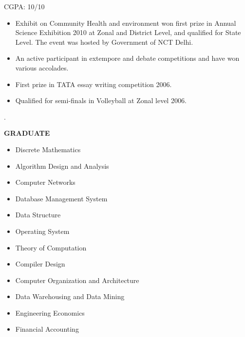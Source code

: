 \vspace{-1em}

CGPA: 10/10


\begin{itemize}
    \item Exhibit on Community Health and environment won first prize in Annual Science Exhibition 2010 at Zonal and District Level, and qualified for State Level. The event was hosted by Government of NCT Delhi.
    \item An active participant in extempore and debate competitions and have won various accolades.
    \item First prize in TATA essay writing competition 2006.
    \item Qualified for semi-finals in Volleyball at Zonal level 2006. 
\end{itemize}.

\vspace{-1.3em}


\textbf{GRADUATE}

\begin{itemize}
\item Discrete Mathematics
\item Algorithm Design and Analysis
\item Computer Networks
\item Database Management System
\item Data Structure
\item Operating System
\item Theory of Computation
\item Compiler Design
\item Computer Organization and Architecture
\item Data Warehousing and Data Mining 
\item Engineering Economics
\item Financial Accounting
\end{itemize}



